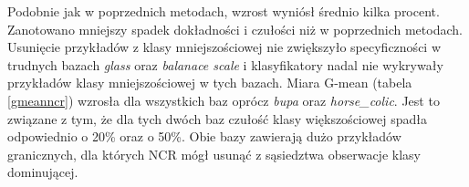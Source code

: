  Podobnie jak w poprzednich metodach, wzrost wyniósł średnio kilka procent. Zanotowano mniejszy spadek dokładności i czułości niż w poprzednich metodach. Usunięcie przykładów z klasy mniejszościowej nie zwiększyło specyficzności w trudnych bazach \textit{glass} oraz \textit{balanace scale} i klasyfikatory nadal nie wykrywały przykładów klasy mniejszościowej w tych bazach. Miara G-mean (tabela \ref{gmeanncr}) wzrosła dla wszystkich baz oprócz \textit{bupa} oraz \textit{horse\_colic}. Jest to związane z tym, że dla tych dwóch baz czułość klasy większościowej spadła odpowiednio o 20\% oraz o 50\%. Obie bazy zawierają dużo przykładów granicznych, dla których NCR mógł usunąć z sąsiedztwa obserwacje klasy dominującej.

			\begin{table}[H]
				\tiny
				\begin{center}
\end{center}
\end{table}
